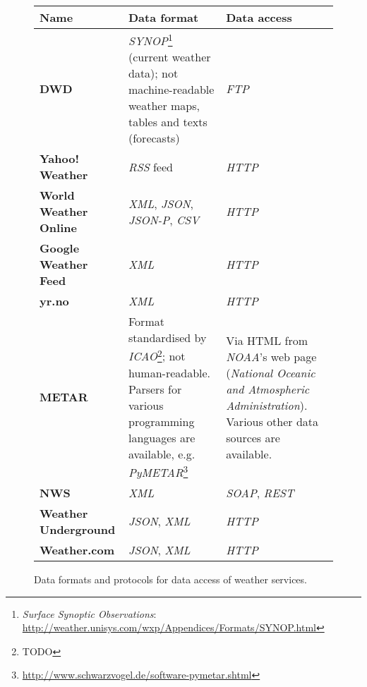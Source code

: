 \begin{figure}
\begin{longtable}{|p{}|p{}|p{}|}
  \hline
  \textbf{Name} & \textbf{Data format} & \textbf{Data access} \\
  \hline\hline
  \textbf{DWD} & \emph{SYNOP}\footnote{\emph{Surface Synoptic Observations}: \href{http://weather.unisys.com/wxp/Appendices/Formats/SYNOP.html}{http://weather.unisys.com/wxp/Appendices/Formats/SYNOP.html}} (current weather data); not machine-readable weather maps, tables and texts (forecasts) & \emph{FTP} \\
  \hline
  \textbf{Yahoo! Weather} & \emph{RSS} feed & \emph{HTTP} \\
  \hline
  \textbf{World Weather Online} & \emph{XML}, \emph{JSON}, \emph{JSON-P}, \emph{CSV} & \emph{HTTP} \\ %
  \hline
  \textbf{Google Weather Feed} & \emph{XML} & \emph{HTTP} \\
  \hline
  \textbf{yr.no} & \emph{XML} & \emph{HTTP} \\
  \hline
  \textbf{METAR} & Format standardised by \emph{ICAO}\footnote{TODO}; not human-readable. Parsers for various programming languages are available, e.g. \emph{PyMETAR}\footnote{\href{http://www.schwarzvogel.de/software-pymetar.shtml}{http://www.schwarzvogel.de/software-pymetar.shtml}} & Via HTML from \emph{NOAA}'s web page (\emph{National Oceanic and Atmospheric Administration}). Various other data sources are available. \\ %
  \hline
  \textbf{NWS} & \emph{XML} & \emph{SOAP}, \emph{REST} \\ %
  \hline
  \textbf{Weather Underground} & \emph{JSON}, \emph{XML} & \emph{HTTP} \\
  \hline
  \textbf{Weather.com} & \emph{JSON}, \emph{XML} & \emph{HTTP} \\
  \hline
\end{longtable}
\vspace{.5em}
\caption{Data formats and protocols for data access of weather services.}
\label{table:weather_data3}
\end{figure}

